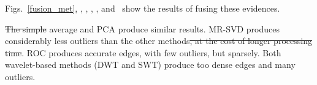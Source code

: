 \documentclass[journal]{IEEEtran}
\providecommand{\DIFadd}[1]{{\protect\color{blue}\uwave{#1}}} %
\providecommand{\DIFdel}[1]{{\protect\color{red}\sout{#1}}}                      %
\providecommand{\DIFaddbegin}{} %
\providecommand{\DIFaddend}{} %
\providecommand{\DIFdelbegin}{} %
\providecommand{\DIFdelend}{} %
\newcommand{\DIFscaledelfig}{0.5}
\newlength{\DIFdelgraphicswidth} %
\newlength{\DIFdelgraphicsheight} %
\newcommand{\DIFaddincludegraphics}[2][]{{\color{blue}\fbox{\DIFOincludegraphics[#1]{#2}}}} %
\newcommand{\DIFdelincludegraphics}[2][]{%
\sbox{\DIFdelgraphicsbox}{\DIFOincludegraphics[#1]{#2}}%
\settoboxwidth{\DIFdelgraphicswidth}{\DIFdelgraphicsbox} %
\settoboxtotalheight{\DIFdelgraphicsheight}{\DIFdelgraphicsbox} %
\scalebox{\DIFscaledelfig}{%
\parbox[b]{\DIFdelgraphicswidth}{\usebox{\DIFdelgraphicsbox}\\[-\baselineskip] \rule{\DIFdelgraphicswidth}{0em}}\llap{\resizebox{\DIFdelgraphicswidth}{\DIFdelgraphicsheight}{%
\setlength{\unitlength}{\DIFdelgraphicswidth}%
\begin{picture}(1,1)%
\thicklines\linethickness{2pt} %
{\color[rgb]{1,0,0}\put(0,0){\framebox(1,1){}}}%
{\color[rgb]{1,0,0}\put(0,0){\line( 1,1){1}}}%
{\color[rgb]{1,0,0}\put(0,1){\line(1,-1){1}}}%
\end{picture}%
}\hspace*{3pt}}} %
} %
\DeclareRobustCommand{\DIFaddbegin}{\DIFOaddbegin \let\includegraphics\DIFaddincludegraphics} %
\DeclareRobustCommand{\DIFaddend}{\DIFOaddend \let\includegraphics\DIFOincludegraphics} %
\DeclareRobustCommand{\DIFdelbegin}{\DIFOdelbegin \let\includegraphics\DIFdelincludegraphics} %
\DeclareRobustCommand{\DIFdelend}{\DIFOaddend \let\includegraphics\DIFOincludegraphics} %
\begin{document}
Figs.~\ref{fusion_met}, 
\DIFaddbegin \DIFadd{\ref{fusion_met}}\DIFaddend {}, 
\DIFaddbegin \DIFadd{\ref{fusion_met}}\DIFaddend {}, 
\DIFaddbegin \DIFadd{\ref{fusion_met}}\DIFaddend {}, 
\DIFaddbegin \DIFadd{\ref{fusion_met}}\DIFaddend {}, 
and~\DIFaddbegin \DIFadd{\ref{fusion_met}}\DIFaddend {} show the results of fusing these evidences. 


\DIFdelbegin \DIFdel{The simple }\DIFdelend \DIFaddbegin \DIFadd{Simple }\DIFaddend average and PCA produce similar results.
MR-SVD produces considerably less outliers than the other methods\DIFdelbegin \DIFdel{, at the cost of longer processing time}\DIFdelend .
ROC produces accurate edges, with few outliers, but sparsely. 
Both wavelet-based methods (DWT and SWT) produce too dense edges and many outliers.

\end{document}
